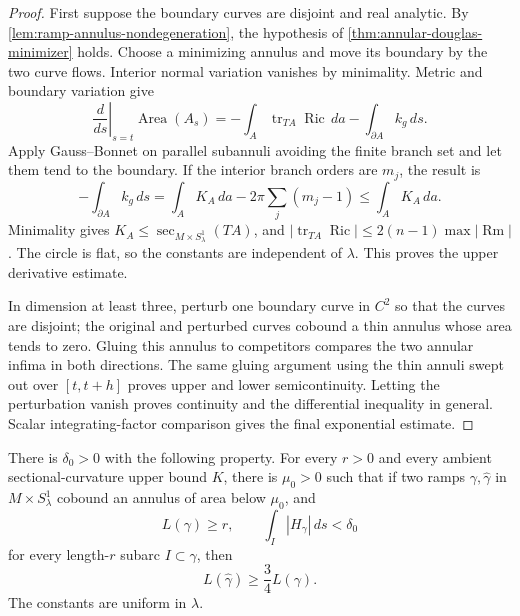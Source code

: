 \begin{proof}
First suppose the boundary curves are disjoint and real analytic.  By
\ref{lem:ramp-annulus-nondegeneration}, the hypothesis of
\ref{thm:annular-douglas-minimizer} holds.  Choose a minimizing annulus and
move its boundary by the two curve flows.  Interior normal variation vanishes
by minimality.  Metric and boundary variation give
\[
 \left.\frac d{ds}\right|_{s=t}\operatorname{Area}(A_s)
 =-\int_A\operatorname{tr}_{TA}\operatorname{Ric}\,da
   -\int_{\partial A}k_g\,ds.
\]
Apply Gauss--Bonnet on parallel subannuli avoiding the finite branch set and
let them tend to the boundary.  If the interior branch orders are $m_j$, the
result is
\[
 -\int_{\partial A}k_g\,ds
 =\int_AK_A\,da-2\pi\sum_j(m_j-1)
 \le\int_AK_A\,da.
\]
Minimality gives $K_A\le\sec_{M\times S^1_\lambda}(TA)$, and
$|\operatorname{tr}_{TA}\operatorname{Ric}|\le2(n-1)\max|\operatorname{Rm}|$.  The circle is flat, so
the constants are independent of $\lambda$.  This proves the upper
derivative estimate.

In dimension at least three, perturb one boundary curve in $C^2$ so that the
curves are disjoint; the original and perturbed curves cobound a thin annulus
whose area tends to zero.  Gluing this annulus to competitors compares the
two annular infima in both directions.  The same gluing argument using the
thin annuli swept out over $[t,t+h]$ proves upper and lower semicontinuity.
Letting the perturbation vanish proves continuity and the differential
inequality in general.  Scalar integrating-factor comparison gives the final
exponential estimate.
\end{proof}

\begin{theorem}
\label{thm:small-annulus-length-transfer}
\notready
There is $\delta_0>0$ with the following property.  For every $r>0$ and every
ambient sectional-curvature upper bound $K$, there is $\mu_0>0$ such that if
two ramps $\gamma,\widehat\gamma$ in $M\times S^1_\lambda$ cobound an
annulus of area below $\mu_0$, and
\[
 L(\gamma)\ge r,
 \qquad
 \int_I|H_\gamma|\,ds<\delta_0
\]
for every length-$r$ subarc $I\subset\gamma$, then
\[
 L(\widehat\gamma)\ge\frac34L(\gamma).
\]
The constants are uniform in $\lambda$.
\end{theorem}

